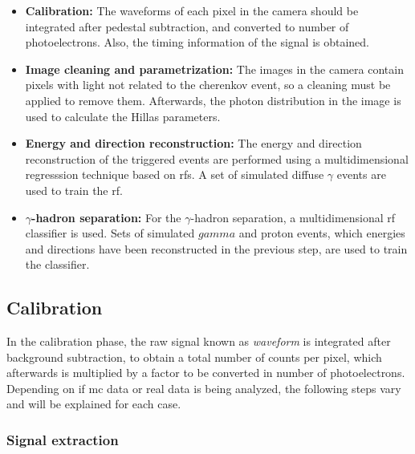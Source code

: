 \documentclass[main.tex]{subfiles}
\begin{document}
\begin{itemize}
\item\textbf{Calibration:} The waveforms of each pixel in the camera should be integrated after pedestal subtraction, and converted to number of photoelectrons. Also, the timing information of the signal is obtained. 
\item\textbf{Image cleaning and parametrization:} The images in the camera contain pixels with light not related to the cherenkov event, so a cleaning must be applied to remove them. Afterwards, the photon distribution in the image is used to calculate the Hillas parameters.
\item\textbf{Energy and direction reconstruction:} The energy and direction reconstruction of the triggered events are performed using a multidimensional regresssion technique based on \glspl{rf}. A set of simulated diffuse $\gamma$ events are used to train the \gls{rf}. 
\item\textbf{$\gamma$-hadron separation:} For the $\gamma$-hadron separation, a multidimensional \gls{rf} classifier is used. Sets of simulated $gamma$ and proton events, which energies and directions have been reconstructed in the previous step, are used to train the classifier.
\end{itemize}

\subsection{Calibration}

In the calibration phase, the raw signal known as \textit{waveform} is integrated after background subtraction, to obtain a total number of counts per pixel, which afterwards is multiplied by a factor to be converted in number of photoelectrons. Depending on if \gls{mc} data or real data is being analyzed, the following steps vary and will be explained for each case.

\subsubsection{Signal extraction} \label{sec:signalext}
\end{document}
